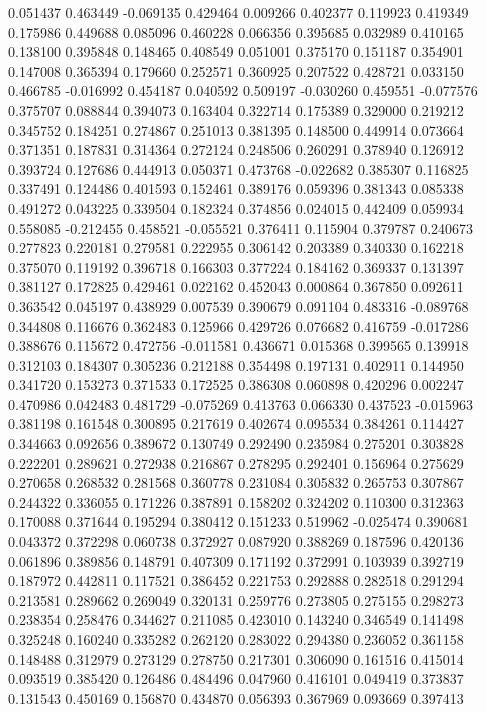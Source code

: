 0.051437
0.463449
-0.069135
0.429464
0.009266
0.402377
0.119923
0.419349
0.175986
0.449688
0.085096
0.460228
0.066356
0.395685
0.032989
0.410165
0.138100
0.395848
0.148465
0.408549
0.051001
0.375170
0.151187
0.354901
0.147008
0.365394
0.179660
0.252571
0.360925
0.207522
0.428721
0.033150
0.466785
-0.016992
0.454187
0.040592
0.509197
-0.030260
0.459551
-0.077576
0.375707
0.088844
0.394073
0.163404
0.322714
0.175389
0.329000
0.219212
0.345752
0.184251
0.274867
0.251013
0.381395
0.148500
0.449914
0.073664
0.371351
0.187831
0.314364
0.272124
0.248506
0.260291
0.378940
0.126912
0.393724
0.127686
0.444913
0.050371
0.473768
-0.022682
0.385307
0.116825
0.337491
0.124486
0.401593
0.152461
0.389176
0.059396
0.381343
0.085338
0.491272
0.043225
0.339504
0.182324
0.374856
0.024015
0.442409
0.059934
0.558085
-0.212455
0.458521
-0.055521
0.376411
0.115904
0.379787
0.240673
0.277823
0.220181
0.279581
0.222955
0.306142
0.203389
0.340330
0.162218
0.375070
0.119192
0.396718
0.166303
0.377224
0.184162
0.369337
0.131397
0.381127
0.172825
0.429461
0.022162
0.452043
0.000864
0.367850
0.092611
0.363542
0.045197
0.438929
0.007539
0.390679
0.091104
0.483316
-0.089768
0.344808
0.116676
0.362483
0.125966
0.429726
0.076682
0.416759
-0.017286
0.388676
0.115672
0.472756
-0.011581
0.436671
0.015368
0.399565
0.139918
0.312103
0.184307
0.305236
0.212188
0.354498
0.197131
0.402911
0.144950
0.341720
0.153273
0.371533
0.172525
0.386308
0.060898
0.420296
0.002247
0.470986
0.042483
0.481729
-0.075269
0.413763
0.066330
0.437523
-0.015963
0.381198
0.161548
0.300895
0.217619
0.402674
0.095534
0.384261
0.114427
0.344663
0.092656
0.389672
0.130749
0.292490
0.235984
0.275201
0.303828
0.222201
0.289621
0.272938
0.216867
0.278295
0.292401
0.156964
0.275629
0.270658
0.268532
0.281568
0.360778
0.231084
0.305832
0.265753
0.307867
0.244322
0.336055
0.171226
0.387891
0.158202
0.324202
0.110300
0.312363
0.170088
0.371644
0.195294
0.380412
0.151233
0.519962
-0.025474
0.390681
0.043372
0.372298
0.060738
0.372927
0.087920
0.388269
0.187596
0.420136
0.061896
0.389856
0.148791
0.407309
0.171192
0.372991
0.103939
0.392719
0.187972
0.442811
0.117521
0.386452
0.221753
0.292888
0.282518
0.291294
0.213581
0.289662
0.269049
0.320131
0.259776
0.273805
0.275155
0.298273
0.238354
0.258476
0.344627
0.211085
0.423010
0.143240
0.346549
0.141498
0.325248
0.160240
0.335282
0.262120
0.283022
0.294380
0.236052
0.361158
0.148488
0.312979
0.273129
0.278750
0.217301
0.306090
0.161516
0.415014
0.093519
0.385420
0.126486
0.484496
0.047960
0.416101
0.049419
0.373837
0.131543
0.450169
0.156870
0.434870
0.056393
0.367969
0.093669
0.397413
